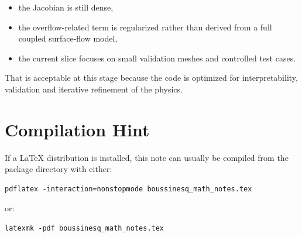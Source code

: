\documentclass[11pt,a4paper]{article}
\begin{document}
\begin{itemize}
\item the Jacobian is still dense,
\item the overflow-related term is regularized rather than derived from a full
      coupled surface-flow model,
\item the current slice focuses on small validation meshes and controlled test
      cases.
\end{itemize}

That is acceptable at this stage because the code is optimized for
interpretability, validation and iterative refinement of the physics.

\section{Compilation Hint}

If a LaTeX distribution is installed, this note can usually be compiled from
the package directory with either:

\begin{verbatim}
pdflatex -interaction=nonstopmode boussinesq_math_notes.tex
\end{verbatim}

or:

\begin{verbatim}
latexmk -pdf boussinesq_math_notes.tex
\end{verbatim}
\end{document}

